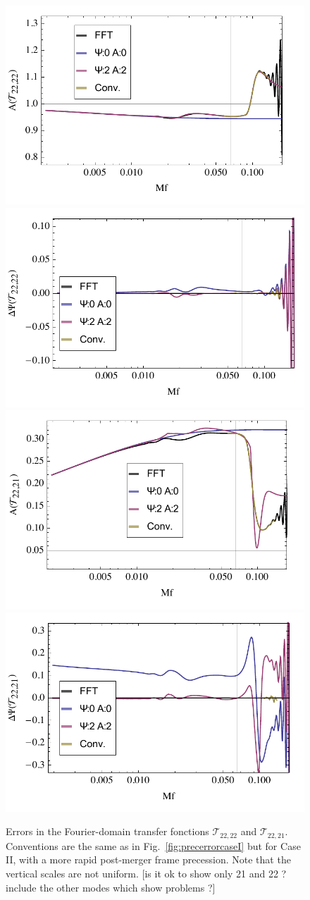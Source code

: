 \documentclass[aps,showpacs,%
prd,superscriptaddress,nofootinbib]{revtex4}
\newcommand\calT{{\mathcal{T}}}
\begin{document}
\begin{figure}
  \centering
  \includegraphics[width=.48\linewidth]{plots/precerrorA22caseII.pdf}
  \hspace{0.2cm}
  \includegraphics[width=.48\linewidth]{plots/precerrorPsi22caseII.pdf}
  \includegraphics[width=.48\linewidth]{plots/precerrorA21caseII.pdf}
  \hspace{0.2cm}
  \includegraphics[width=.48\linewidth]{plots/precerrorPsi21caseII.pdf}  
  \caption{Errors in the Fourier-domain transfer fonctions $\calT_{22,22}$ and $\calT_{22,21}$. Conventions are the same as in Fig.~\ref{fig:precerrorcaseI} but for Case II, with a more rapid post-merger frame precession. Note that the vertical scales are not uniform. [is it ok to show only 21 and 22 ? include the other modes which show problems ?]}
  \label{fig:precerrorcaseII}
\end{figure}
\end{document}
